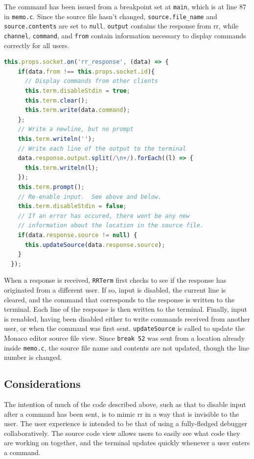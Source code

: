 \documentclass[12pt]{article}
\begin{document}
The command has been issued from a breakpoint set at \lstinline{main},
which is at line 87 in \lstinline{memo.c}.  Since the source file
hasn't changed, \lstinline{source.file_name} and
\lstinline{source.contents} are set to \lstinline{null}.
\lstinline{output} contains the response from rr, while
\lstinline{channel}, \lstinline{command}, and \lstinline{from} contain
information necessary to display commands correctly for all users.

\begin{lstlisting}[language=Javascript,basicstyle=\linespread{0.5}\ttfamily,caption={Processing a Response},captionpos=b]
  this.props.socket.on('rr_response', (data) => {
    if(data.from !== this.props.socket.id){
      // Display commands from other clients
      this.term.disableStdin = true;
      this.term.clear();
      this.term.write(data.command);
    };
    // Write a newline, but no prompt
    this.term.writeln('');
    // Write each line of the output to the terminal
    data.response.output.split(/\n+/).forEach((l) => {
      this.term.writeln(l);
    });
    this.term.prompt();
    // Re-enable input.  See above and below.
    this.term.disableStdin = false;
    // If an error has occured, there wont be any new
    // information about the location in the source file.
    if(data.response.source != null) {
      this.updateSource(data.response.source);
    }
  });
\end{lstlisting}

When a response is received, \lstinline{RRTerm} first checks to see if
the response has originated from a different user.  If so, input is
disabled, the current line is cleared, and the command that
corresponds to the response is written to the terminal.  Each line of
the response is then written to the terminal.  Finally, input is
renabled, having been disabled either to write commands received from
another user, or when the command was first sent.
\lstinline{updateSource} is called to update the Monaco editor source
file view.  Since \lstinline{break 52} was sent from a location
already inside \lstinline{memo.c}, the source file name and contents
are not updated, though the line number is changed.

\subsection{Considerations} \label{vistools}

The intention of much of the code described above, such as that to
disable input after a command has been sent, is to mimic rr in a way
that is invisible to the user.  The user experience is intended to be
that of using a fully-fledged debugger collaboratively.  The source
code view allows users to easily see what code they are working on
together, and the terminal updates quickly whenever a user enters a
command.
\par
\end{document}
